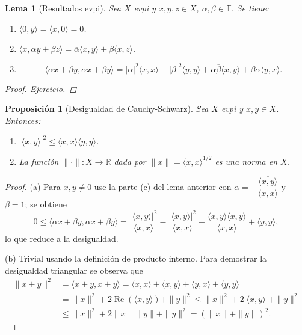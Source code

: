 \documentclass[11pt]{article}
\theoremstyle{definition}
\theoremstyle{plain}
\newtheorem{lemma}[definition]{Lema}
\newtheorem{proposition}[definition]{Proposición}
\begin{document}
\begin{lemma}[Resultados evpi]
Sea $X$ evpi y $x,y,z\in X$, $\alpha,\beta\in\mathbb{F}$. Se tiene:
\begin{enumerate}[label=\alph*)]
\item $\langle 0,y\rangle=\langle x,0\rangle=0$.
\item $\langle x,\alpha y+\beta z\rangle=\overline{\alpha}\langle x,y\rangle+\overline{\beta}\langle x,z\rangle$.
\item
\[\langle\alpha x+\beta y,\alpha x+\beta y\rangle=|\alpha|^2\langle x,x\rangle+|\beta|^2\langle y,y\rangle+\alpha\overline{\beta}\langle x,y\rangle+\beta\overline{\alpha}\langle y,x\rangle.\]
\end{enumerate}
\begin{proof}
Ejercicio.
\end{proof}
\end{lemma}

\begin{proposition}[Desigualdad de Cauchy-Schwarz]
Sea $X$ evpi y $x,y\in X$. Entonces:
\begin{enumerate}[label=\alph*)]
\item $|\langle x,y\rangle|^2\le\langle x,x\rangle\langle y,y\rangle$.
\item La función $\|\cdot\|:X\to\mathbb{R}$ dada por $\|x\|=\langle x,x\rangle^{1/2}$ es una norma en $X$.
\end{enumerate}
\end{proposition}

\begin{proof}
(a) Para $x,y\neq0$ use la parte (c) del lema anterior con
$\alpha=-\dfrac{\overline{\langle x,y\rangle}}{\langle x,x\rangle}$ y $\beta=1$; se obtiene
$$0\le\langle\alpha x+\beta y,\alpha x+\beta y\rangle=\frac{|\langle x,y\rangle|^2}{\langle x,x\rangle}-\frac{|\langle x,y\rangle|^2}{\langle x,x\rangle}-\frac{\langle x,y\rangle\overline{\langle x,y\rangle}}{\langle x,x\rangle}+\langle y,y\rangle,$$
lo que reduce a la desigualdad.

(b) Trivial usando la definición de producto interno. Para demostrar la desigualdad triangular se observa que
\begin{align*}
\|x+y\|^{2}&=\langle x+y,x+y\rangle=\langle x,x\rangle+\langle x,y\rangle+\langle y,x\rangle+\langle y,y\rangle\\
&=\|x\|^2+2\operatorname{Re}(\langle x,y\rangle)+\|y\|^2\le\|x\|^2+2|\langle x,y\rangle|+\|y\|^2\\
&\le\|x\|^2+2\|x\|\|y\|+\|y\|^2=(\|x\|+\|y\|)^2.
\end{align*}
\end{proof}
\end{document}
